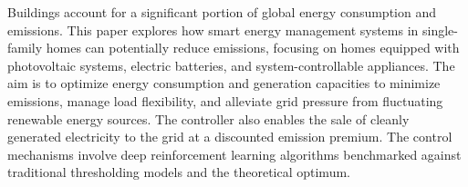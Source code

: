 Buildings account for a significant portion of global energy consumption and emissions. This paper explores how smart energy management systems in single-family homes can potentially reduce emissions, focusing on homes equipped with photovoltaic systems, electric batteries, and system-controllable appliances. The aim is to optimize energy consumption and generation capacities to minimize emissions, manage load flexibility, and alleviate grid pressure from fluctuating renewable energy sources. The controller also enables the sale of cleanly generated electricity to the grid at a discounted emission premium. The control mechanisms involve deep reinforcement learning algorithms benchmarked against traditional thresholding models and the theoretical optimum.